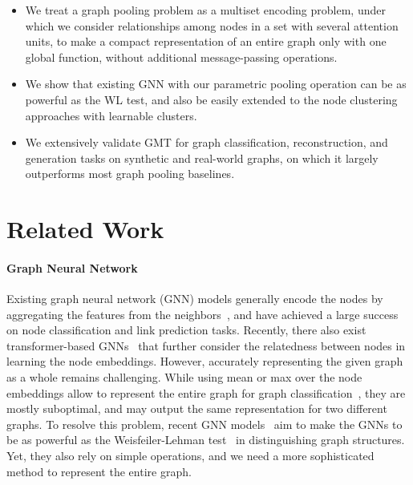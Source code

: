 \documentclass{article} \usepackage{iclr2021_conference,times}
\begin{document}
\begin{itemize}[itemsep=1.0mm, leftmargin=*]
\item We treat a graph pooling problem as a multiset encoding problem, under which we consider relationships among nodes in a set with several attention units, to make a compact representation of an entire graph only with one global function, without additional message-passing operations.
\item We show that existing GNN with our parametric pooling operation can be as powerful as the WL test, and also be easily extended to the node clustering approaches with learnable clusters.
\item We extensively validate GMT for graph classification, reconstruction, and generation tasks on synthetic and real-world graphs, on which it largely outperforms most graph pooling baselines.
\end{itemize}

 \section{Related Work}

\vspace{-0.03in}
\paragraph{Graph Neural Network}
Existing graph neural network (GNN) models generally encode the nodes by aggregating the features from the neighbors~\citep{GCN, GraphSAGE, GAT, PGNN}, and have achieved a large success on node classification and link prediction tasks. Recently, there also exist transformer-based GNNs~\citep{graph/transformer, graph/transformer/2} that further consider the relatedness between nodes in learning the node embeddings. However, accurately representing the given graph as a whole remains challenging. While using mean or max over the node embeddings allow to represent the entire graph for graph classification~\citep{graph/classification/1, graph/classification/2}, they are mostly suboptimal, and may output the same representation for two different graphs. To resolve this problem, recent GNN models~\citep{GIN, WL/GNN} aim to make the GNNs to be as powerful as the Weisfeiler-Lehman test~\citep{WLtest} in distinguishing graph structures. Yet, they also rely on simple operations, and we need a more sophisticated method to represent the entire graph.

\vspace{-0.03in}
\end{document}
